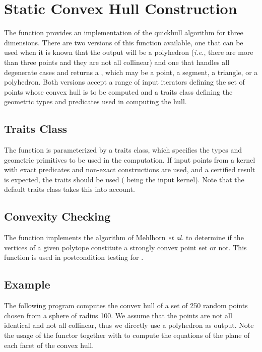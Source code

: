 \section{Static Convex Hull Construction\label{sec:convex_hull_3}}


The function 
 provides an 
implementation of the quickhull algorithm \cite{bdh-qach-96} for three 
dimensions.  There are two versions of this
function available, one that can be used when it is known that the output
will be a polyhedron (\textit{i.e.}, there are more than three points and
they are not all collinear) and one that handles all degenerate cases
and returns a , which may be a point, a segment, a
triangle, or a polyhedron.  Both versions accept a range of input
iterators defining the set of points whose convex hull is to be computed
and a traits class defining the geometric types and predicates used in
computing the hull.

\subsection{Traits Class}

The function  is parameterized by a traits class,
which specifies the types and geometric primitives to be used in the
computation. If input points from a kernel with exact predicates 
and non-exact constructions are used, and a certified result is expected,
the traits  should be used 
( being the input kernel). Note that the default traits class takes this into
account.

\subsection{Convexity Checking}

The function 
implements the algorithm of Mehlhorn \textit{et al.} \cite{mnssssu-cgpvg-96} 
to determine if the vertices of a given polytope constitute a strongly convex 
point set or not.  This function is used in postcondition testing for
.

\subsection{Example}
The following program computes the convex hull of a set of 250 random
points chosen from a sphere of radius 100. We assume that the points are
not all identical and not all collinear, thus we directly use a polyhedron
as output. Note the usage of the functor  together with
 to compute the equations of the plane of each facet
of the convex hull.

